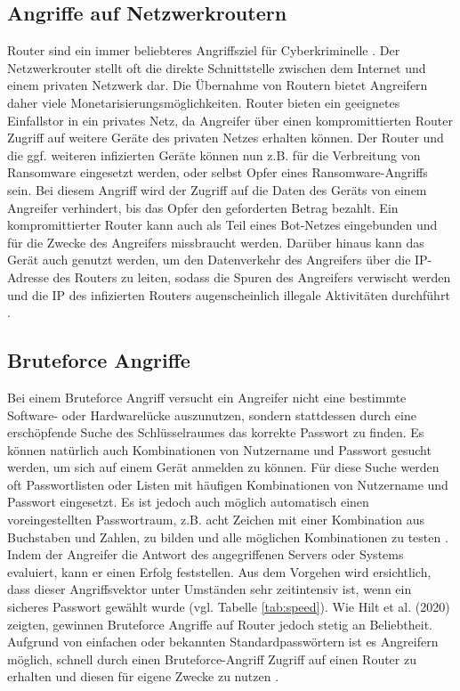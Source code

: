 \documentclass[a4paper]{book}
\begin{document}
\begin{large}
\section{Angriffe auf Netzwerkroutern}
\label{Angriffe}

\begin{onehalfspace}

Router sind ein immer beliebteres Angriffsziel für Cyberkriminelle \cite{StephenHilt.2020}. Der Netzwerkrouter stellt oft die direkte Schnittstelle zwischen dem Internet und einem privaten Netzwerk dar. Die Übernahme von Routern bietet Angreifern daher viele Monetarisierungsmöglichkeiten. Router bieten ein geeignetes Einfallstor in ein privates Netz, da Angreifer über einen kompromittierten Router Zugriff auf weitere Geräte des privaten Netzes erhalten können. Der Router und die ggf. weiteren infizierten Geräte können nun z.B. für die Verbreitung von Ransomware eingesetzt werden, oder selbst Opfer eines Ransomware-Angriffs sein. Bei diesem Angriff wird der Zugriff auf die Daten des Geräts von einem Angreifer verhindert, bis das Opfer den geforderten Betrag bezahlt. Ein kompromittierter Router kann auch als Teil eines Bot-Netzes eingebunden und für die Zwecke des Angreifers missbraucht werden. Darüber hinaus kann das Gerät auch genutzt werden, um den Datenverkehr des Angreifers über die IP-Adresse des Routers zu leiten, sodass die Spuren des Angreifers verwischt werden und die IP des infizierten Routers augenscheinlich illegale Aktivitäten durchführt \cite{StephenHilt.2020}.



\subsection{Bruteforce Angriffe}
\label{bruteforce}
Bei einem Bruteforce Angriff versucht ein Angreifer nicht eine bestimmte Software- oder Hardwarelücke auszunutzen, sondern stattdessen durch eine erschöpfende Suche des Schlüsselraumes das korrekte Passwort zu finden. Es können natürlich auch Kombinationen von Nutzername und Passwort gesucht werden, um sich auf einem Gerät anmelden zu können. Für diese Suche werden oft Passwortlisten oder Listen mit häufigen Kombinationen von Nutzername und Passwort eingesetzt. Es ist jedoch auch möglich automatisch einen voreingestellten Passwortraum, z.B. acht Zeichen mit einer Kombination aus Buchstaben und Zahlen, zu bilden und alle möglichen Kombinationen zu testen \cite{OWASP.2020}. Indem der Angreifer die Antwort des angegriffenen Servers oder Systems evaluiert, kann er einen Erfolg feststellen. Aus dem Vorgehen wird ersichtlich, dass dieser Angriffsvektor unter Umständen sehr zeitintensiv ist, wenn ein sicheres Passwort gewählt wurde (vgl. Tabelle \ref{tab:speed}). Wie Hilt et al. (2020) zeigten, gewinnen Bruteforce Angriffe auf Router jedoch stetig an Beliebtheit. Aufgrund von einfachen oder bekannten Standardpasswörtern ist es Angreifern möglich, schnell durch einen Bruteforce-Angriff Zugriff auf einen Router zu erhalten und diesen für eigene Zwecke zu nutzen \cite[p.~5]{StephenHilt.2020}. \\



\end{onehalfspace}
\end{large}
\end{document}
